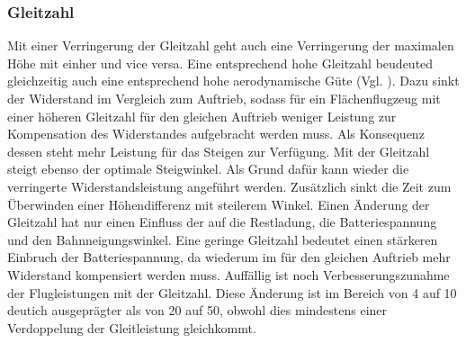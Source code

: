 \subsubsection{Gleitzahl}
Mit einer Verringerung der Gleitzahl geht auch eine Verringerung der maximalen Höhe mit einher und vice versa. Eine entsprechend hohe Gleitzahl beudeuted gleichzeitig auch eine entsprechend hohe aerodynamische Güte (Vgl. \cite[S.34]{Scheiderer.2008}). Dazu sinkt der Widerstand im Vergleich zum Auftrieb, sodass für ein Flächenflugzeug mit einer höheren Gleitzahl für den gleichen Auftrieb weniger Leistung zur Kompensation des Widerstandes aufgebracht werden muss. Als Konsequenz dessen steht mehr Leistung für das Steigen zur Verfügung. Mit der Gleitzahl steigt ebenso der optimale Steigwinkel. Als Grund dafür kann wieder die verringerte Widerstandsleistung angeführt werden. Zusätzlich sinkt die Zeit zum Überwinden einer Höhendifferenz mit steilerem Winkel. Einen Änderung der Gleitzahl hat nur einen Einfluss der auf die Restladung, die Batteriespannung und den Bahnneigungswinkel. Eine geringe Gleitzahl bedeutet einen stärkeren Einbruch der Batteriespannung, da wiederum im für den gleichen Auftrieb mehr Widerstand kompensiert werden muss. Auffällig ist noch Verbesserungszunahme der Flugleistungen mit der Gleitzahl. Diese Änderung ist im Bereich von 4 auf 10 deutich ausgeprägter als von 20 auf 50, obwohl dies mindestens einer Verdoppelung der Gleitleistung gleichkommt.
